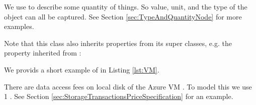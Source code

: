 We use  to describe some quantity of things.
So value, unit, and the type of the object can all be captured. See Section \ref{sec:TypeAndQuantityNode} for more examples.

Note that this class also inherits properties from its super classes, e.g. the property inherited from :

  

We provids a short example of  in Listing \ref{lst:VM}.

There are data access fees on local disk of the Azure VM \cite{data_access_fees_local_disk_AzureVM}. To model this we use
  1 .
See Section \ref{sec:StorageTransactionsPriceSpecification} for an example.

